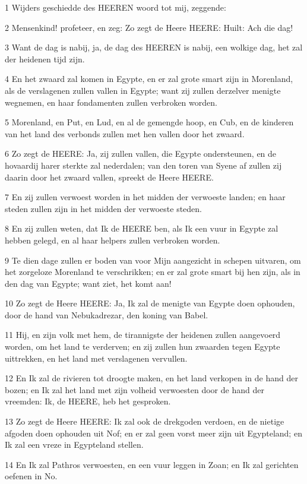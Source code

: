 \par 1 Wijders geschiedde des HEEREN woord tot mij, zeggende:
\par 2 Mensenkind! profeteer, en zeg: Zo zegt de Heere HEERE: Huilt: Ach die dag!
\par 3 Want de dag is nabij, ja, de dag des HEEREN is nabij, een wolkige dag, het zal der heidenen tijd zijn.
\par 4 En het zwaard zal komen in Egypte, en er zal grote smart zijn in Morenland, als de verslagenen zullen vallen in Egypte; want zij zullen derzelver menigte wegnemen, en haar fondamenten zullen verbroken worden.
\par 5 Morenland, en Put, en Lud, en al de gemengde hoop, en Cub, en de kinderen van het land des verbonds zullen met hen vallen door het zwaard.
\par 6 Zo zegt de HEERE: Ja, zij zullen vallen, die Egypte ondersteunen, en de hovaardij harer sterkte zal nederdalen; van den toren van Syene af zullen zij daarin door het zwaard vallen, spreekt de Heere HEERE.
\par 7 En zij zullen verwoest worden in het midden der verwoeste landen; en haar steden zullen zijn in het midden der verwoeste steden.
\par 8 En zij zullen weten, dat Ik de HEERE ben, als Ik een vuur in Egypte zal hebben gelegd, en al haar helpers zullen verbroken worden.
\par 9 Te dien dage zullen er boden van voor Mijn aangezicht in schepen uitvaren, om het zorgeloze Morenland te verschrikken; en er zal grote smart bij hen zijn, als in den dag van Egypte; want ziet, het komt aan!
\par 10 Zo zegt de Heere HEERE: Ja, Ik zal de menigte van Egypte doen ophouden, door de hand van Nebukadrezar, den koning van Babel.
\par 11 Hij, en zijn volk met hem, de tirannigste der heidenen zullen aangevoerd worden, om het land te verderven; en zij zullen hun zwaarden tegen Egypte uittrekken, en het land met verslagenen vervullen.
\par 12 En Ik zal de rivieren tot droogte maken, en het land verkopen in de hand der bozen; en Ik zal het land met zijn volheid verwoesten door de hand der vreemden: Ik, de HEERE, heb het gesproken.
\par 13 Zo zegt de Heere HEERE: Ik zal ook de drekgoden verdoen, en de nietige afgoden doen ophouden uit Nof; en er zal geen vorst meer zijn uit Egypteland; en Ik zal een vreze in Egypteland stellen.
\par 14 En Ik zal Pathros verwoesten, en een vuur leggen in Zoan; en Ik zal gerichten oefenen in No.
